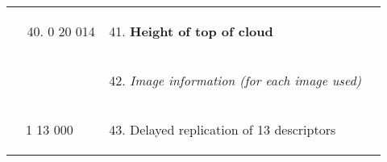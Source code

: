 \begin{longtable}[]{@{}llll@{}}
\begin{minipage}[t]{0.22\columnwidth}\raggedright
\strut
\end{minipage} & \begin{minipage}[t]{0.22\columnwidth}\raggedright
\begin{enumerate}
\setcounter{enumi}{39}
\item
  0 20 014
\end{enumerate}\strut
\end{minipage} & \begin{minipage}[t]{0.22\columnwidth}\raggedright
\begin{enumerate}
\setcounter{enumi}{40}
\item
  \textbf{Height of top of cloud}
\end{enumerate}\strut
\end{minipage} & \begin{minipage}[t]{0.22\columnwidth}\raggedright
\strut
\end{minipage}\tabularnewline
\begin{minipage}[t]{0.22\columnwidth}\raggedright
\strut
\end{minipage} & \begin{minipage}[t]{0.22\columnwidth}\raggedright
\strut
\end{minipage} & \begin{minipage}[t]{0.22\columnwidth}\raggedright
\begin{enumerate}
\setcounter{enumi}{41}
\item
  \emph{Image information (for each image used)}
\end{enumerate}\strut
\end{minipage} & \begin{minipage}[t]{0.22\columnwidth}\raggedright
\strut
\end{minipage}\tabularnewline
\begin{minipage}[t]{0.22\columnwidth}\raggedright
\strut
\end{minipage} & \begin{minipage}[t]{0.22\columnwidth}\raggedright
1 13 000\strut
\end{minipage} & \begin{minipage}[t]{0.22\columnwidth}\raggedright
\begin{enumerate}
\setcounter{enumi}{42}
\item
  Delayed replication of 13 descriptors
\end{enumerate}\strut
\end{minipage} & \begin{minipage}[t]{0.22\columnwidth}\raggedright

\end{minipage}
\end{longtable}
